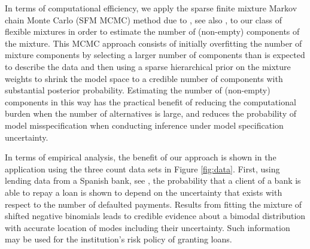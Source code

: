 \documentclass[11pt]{article}
\begin{document}

In terms of computational efficiency, we apply the sparse finite mixture Markov chain Monte Carlo (SFM MCMC) method  due to \cite{Mal:SFS:2016},  see also \cite{SFS:Mal:2019}, to our class of flexible mixtures in order to estimate the number of (non-empty) components of the mixture. This MCMC approach consists of initially overfitting the number of mixture components by selecting a larger number of components than is expected to describe the data and then using a sparse hierarchical prior on the mixture weights to shrink the model space to a credible number of components with substantial posterior probability. Estimating the number of (non-empty) components in this way has the practical benefit of reducing the computational burden when the number of alternatives is large, and reduces the probability of model misspecification when conducting inference under model specification uncertainty. 








In terms of empirical analysis, the benefit of our approach is shown in the application using the three  count data sets in Figure \ref{fig:data}. First, using  lending data from a Spanish bank, see \cite{dionne1996count},  the probability that a client of a bank is able to repay a loan is shown to depend on the uncertainty that exists with respect to the number of defaulted payments.  Results from fitting the mixture of shifted negative binomials leads to credible evidence about a bimodal distribution with accurate location of modes including their uncertainty. Such information may be used for the institution's risk policy of granting loans. 
\end{document}
